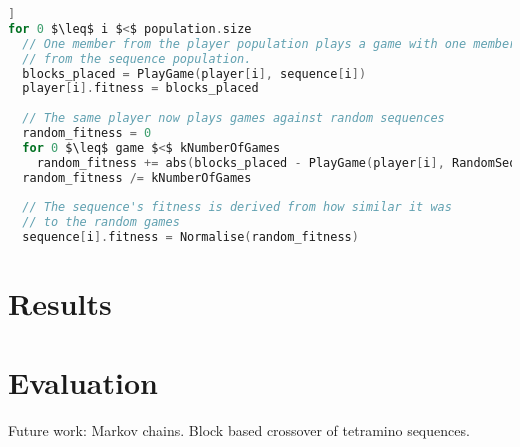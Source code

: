 \documentclass[a4paper,11pt]{article}
\begin{document}
\begin{lstlisting}[firstnumber=1,language=c,morekeywords={until,foreach,in},frame=single,mathescape=true,caption={Pseudo-code of the algorithm used to evolve one generation},label={psuedocode},float=[htb]]
for 0 $\leq$ i $<$ population.size
  // One member from the player population plays a game with one member
  // from the sequence population.
  blocks_placed = PlayGame(player[i], sequence[i])
  player[i].fitness = blocks_placed
  
  // The same player now plays games against random sequences
  random_fitness = 0
  for 0 $\leq$ game $<$ kNumberOfGames
    random_fitness += abs(blocks_placed - PlayGame(player[i], RandomSequence()))
  random_fitness /= kNumberOfGames
  
  // The sequence's fitness is derived from how similar it was
  // to the random games
  sequence[i].fitness = Normalise(random_fitness)
\end{lstlisting}

\section{Results}

\section{Evaluation}

Future work:
Markov chains.
Block based crossover of tetramino sequences.


\end{document}
